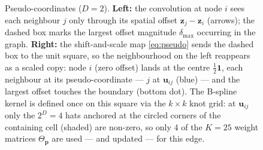 \documentclass{article} %
\newcommand{\bu}{\mathbf{u}}
\newcommand{\bz}{\mathbf{z}}
\begin{document}
\begin{figure}[t]
\caption{Pseudo-coordinates ($D{=}2$). \textbf{Left:} the
convolution at node $i$ sees each neighbour $j$ only through its spatial
offset $\bz_j-\bz_i$ (arrows); the dashed box marks the largest offset
magnitude $\delta_{\max}$ occurring in the graph. \textbf{Right:} the
shift-and-scale map \eqref{eq:pseudo} sends the dashed box to the unit
square, so the neighbourhood on the left reappears as a scaled copy: node
$i$ (zero offset) lands at the centre $\tfrac12\mathbf 1$, each neighbour
at its pseudo-coordinate --- $j$ at $\bu_{ij}$ (blue) --- and the largest
offset touches the boundary (bottom dot). The B-spline kernel is
defined once on this square via the $k{\times}k$ knot grid: at $\bu_{ij}$
only the $2^D{=}4$ hats anchored at the circled corners of the
containing cell (shaded) are non-zero, so only $4$ of the $K{=}25$ weight
matrices $\Theta_{\mathbf p}$ are used --- and updated --- for this edge.}
\label{fig:coords}
\end{figure}
\end{document}
